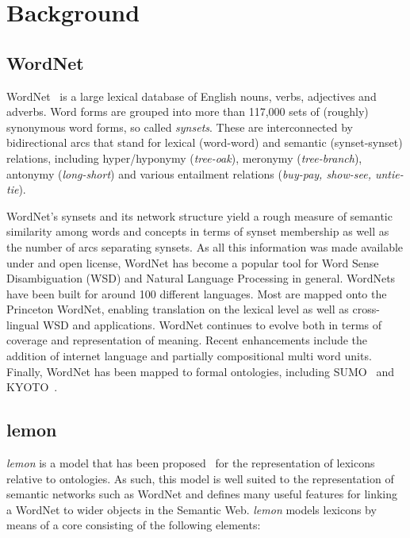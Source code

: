 \documentclass[10pt, a4paper]{article}
\newcommand{\lemon}[0]{\emph{lemon}}
\begin{document}
\section{Background}

\subsection{WordNet}

WordNet~\cite{miller1995wordnet,fellbaum1998wordnet,fellbaum2010wordnet} is a large lexical database of English nouns,
verbs, adjectives and adverbs. Word forms are grouped into more than 117,000 sets of
(roughly) synonymous word forms, so called \emph{synsets}. These are interconnected by bidirectional
arcs that stand for lexical (word-word) and semantic (synset-synset) relations, including
hyper/hyponymy (\emph{tree-oak}), meronymy (\emph{tree-branch}), antonymy
(\emph{long-short}) and various entailment relations (\emph{buy-pay, show-see, untie-
tie}).

WordNet's synsets and its network structure yield a rough measure of semantic similarity
among words and concepts in terms of synset membership as well as the number of arcs
separating synsets. As all this information was made available under and open license, WordNet has become a popular tool for Word Sense
Disambiguation (WSD) and Natural Language Processing in general. WordNets have
been built for around 100 different languages. Most are mapped onto the Princeton
WordNet, enabling translation on the lexical level as well as cross-lingual WSD and
applications. WordNet continues to evolve both in terms of coverage and representation
of meaning. Recent enhancements include the addition of internet language and partially
compositional multi word units. Finally, WordNet has been mapped to formal ontologies, 
including SUMO~\cite{niles2003mapping} and KYOTO~\cite{vossen2014kyoto}.

\subsection{lemon}

\lemon{} is a model that has been proposed~\cite{mccrae2012interchanging} for the representation of
lexicons relative to ontologies. As such, this model is well suited to the
representation of semantic networks such as WordNet and defines many useful
features for linking a WordNet to wider objects in the Semantic Web. \lemon{}
models lexicons by means of a core consisting of the following elements:
\end{document}
